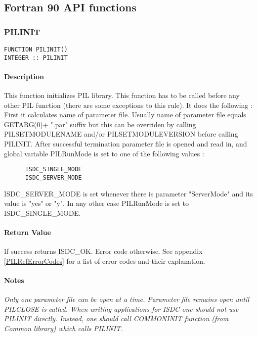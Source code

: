 \subsection{Fortran 90 API functions}\label{PILRefF90functions}


\subsubsection{PILINIT}

\begin{verbatim}
FUNCTION PILINIT() 
INTEGER :: PILINIT 
\end{verbatim}

\paragraph{Description\\}
This function initializes PIL library. This function has to be called before
any other PIL function (there are some
exceptions to this rule).  It does the following : \\
First it calculates name of parameter file. Usually name of parameter file
equals GETARG(0)+ ".par" suffix but
this can be overriden by calling PILSETMODULENAME and/or PILSETMODULEVERSION
before calling PILINIT.
After successful termination parameter file is opened and read in, and
global variable PILRunMode is set to one
of the following values : 

\begin{verbatim}
      ISDC_SINGLE_MODE 
      ISDC_SERVER_MODE 
\end{verbatim}

ISDC\_SERVER\_MODE is set whenever there is parameter "ServerMode" and its
value is "yes" or "y". In any other case PILRunMode is set
to ISDC\_SINGLE\_MODE. 

\paragraph{Return Value\\}
If success returns ISDC\_OK. Error code otherwise. See appendix \ref{PILRefErrorCodes}
for a list of error codes and their explanation.

\paragraph{Notes\\}
{\it
Only one parameter file can be open at a time. Parameter file remains open
until PILCLOSE is called.
When writing applications for ISDC one should not use PILINIT directly.
Instead, one should call COMMONINIT
function (from Common library) which calls PILINIT.
}


